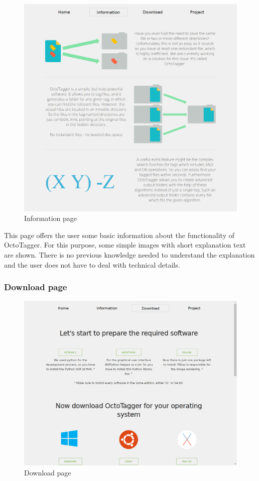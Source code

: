 \begin{figure}
\centering
\includegraphics[scale=0.35]{images/information_full.png}
\caption{Information page}
\end{figure}

This page offers the user some basic information about the functionality of OctoTagger. For this purpose, some simple images with short explanation text are shown. There is no previous knowledge needed to understand the explanation and the user does not have to deal with technical details.

\subsubsection{Download page}

\begin{figure}
\centering
\includegraphics[scale=0.35]{images/download_full.png}
\caption{Download page}
\end{figure}

